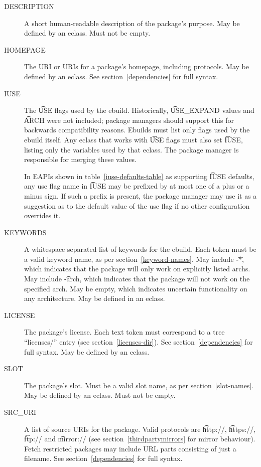 \begin{description}
\item[DESCRIPTION] A short human-readable description of the package's purpose. May be defined by an
    eclass. Must not be empty.
\item[HOMEPAGE] The URI or URIs for a package's homepage, including protocols. May be defined by an
    eclass. See section~\ref{dependencies} for full syntax.
\item[IUSE] The \t{USE} flags used by the ebuild. Historically, \t{USE\_EXPAND} values and \t{ARCH}
    were not included; package managers should support this for backwards compatibility reasons. Ebuilds
    must list only flags used by the ebuild itself. Any eclass that works with \t{USE} flags
    must also set \t{IUSE}, listing only the variables used by that eclass. The package manager is
    responsible for merging these values.

    In EAPIs shown in table~\ref{iuse-defaults-table} as supporting \t{IUSE} defaults, any use flag
    name in \t{IUSE} may be prefixed by at most one of a plus or a minus sign. If such a prefix is
    present, the package manager may use it as a suggestion as to the default value of the use flag
    if no other configuration overrides it.
\item[KEYWORDS] A whitespace separated list of keywords for the ebuild. Each token must be a
    valid keyword name, as per section~\ref{keyword-names}. May include \t{-*}, which
    indicates that the package will only work on explicitly listed archs. May include \t{-arch},
    which indicates that the package will not work on the specified arch. May be empty, which
    indicates uncertain functionality on any architecture. May be defined in an eclass.
\item[LICENSE] The package's license. Each text token must correspond to a tree ``licenses/'' entry
    (see section~\ref{licenses-dir}). See section~\ref{dependencies} for full syntax.
    May be defined by an eclass. \label{ebuild-var-LICENSE}
\item[SLOT] The package's slot. Must be a valid slot name, as per section~\ref{slot-names}. May
    be defined by an eclass. Must not be empty.
\item[SRC\_URI] A list of source URIs for the package. Valid protocols are \t{http://},
    \t{https://}, \t{ftp://} and \t{mirror://} (see section~\ref{thirdpartymirrors} for mirror behaviour).
    Fetch restricted packages may include URL parts consisting of just a filename. See
    section~\ref{dependencies} for full syntax.
\end{description}

